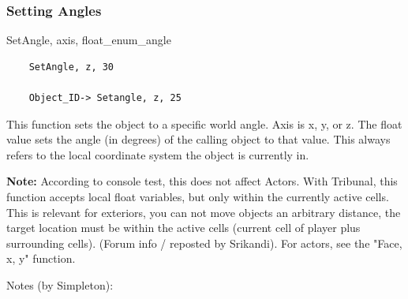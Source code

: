 \hypertarget{setting-angles}{%
\subsubsection{\texorpdfstring{Setting Angles
}{Setting Angles }}\label{setting-angles}}

SetAngle, axis, float\_enum\_angle

\begin{lstlisting}
	SetAngle, z, 30
	
	Object_ID-> Setangle, z, 25
\end{lstlisting}

This function sets the object to a specific world angle. Axis is x, y,
or z. The float value sets the angle (in degrees) of the calling object
to that value. This always refers to the local coordinate system the
object is currently in.

\textbf{Note:} According to console test, this does not affect Actors.
With Tribunal, this function accepts local float variables, but only
within the currently active cells. This is relevant for exteriors, you
can not move objects an arbitrary distance, the target location must be
within the active cells (current cell of player plus surrounding cells).
(Forum info / reposted by Srikandi). For actors, see the "Face, x, y"
function.

Notes (by Simpleton):

